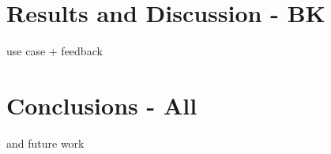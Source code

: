 \documentclass[twocolumn]{bmcart}%
\begin{document}
 
\section*{Results and Discussion - BK}
use case + feedback

\section*{Conclusions - All}
and future work 

\end{document}
